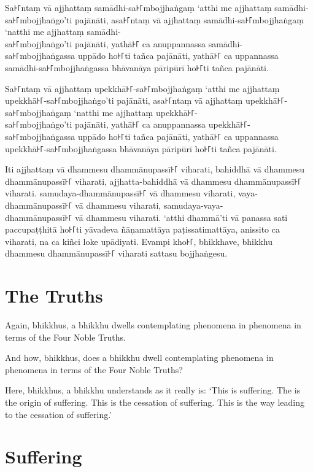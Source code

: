 Sa꜔꜒ntaṃ vā ajjhattaṃ samādhi-sa꜔꜒mbojjhaṅgaṃ ‘atthi me ajjhattaṃ samādhi-sa꜔꜒mbojjhaṅgo’ti pajānāti,
asa꜔꜒ntaṃ vā ajjhattaṃ samādhi-sa꜔꜒mbojjhaṅgaṃ ‘natthi me ajjhattaṃ samādhi-\\ sa꜔꜒mbojjhaṅgo’ti pajānāti,
yathā꜔꜒ ca anuppannassa samādhi-\\ sa꜔꜒mbojjhaṅgassa uppādo ho꜔꜒ti tañca pajānāti,
yathā꜔꜒ ca uppannassa samādhi-sa꜔꜒mbojjhaṅgassa bhāvanāya pāripūrī ho꜔꜒ti tañca pajānāti.

Sa꜔꜒ntaṃ vā ajjhattaṃ upekkhā꜔꜒-sa꜔꜒mbojjhaṅgaṃ ‘atthi me ajjhattaṃ upekkhā꜔꜒-sa꜔꜒mbojjhaṅgo’ti pajānāti,
asa꜔꜒ntaṃ vā ajjhattaṃ upekkhā꜔꜒-sa꜔꜒mbojjhaṅgaṃ ‘natthi me ajjhattaṃ upekkhā꜔꜒-\\ sa꜔꜒mbojjhaṅgo’ti pajānāti,
yathā꜔꜒ ca anuppannassa upekkhā꜔꜒-\\ sa꜔꜒mbojjhaṅgassa uppādo ho꜔꜒ti tañca pajānāti,
yathā꜔꜒ ca uppannassa upekkhā꜔꜒-sa꜔꜒mbojjhaṅgassa bhāvanāya pāripūrī ho꜔꜒ti tañca pajānāti.

Iti ajjhattaṃ vā dhammesu dhammānupassī꜔꜒ viharati,
bahiddhā vā dhammesu dhammānupassī꜔꜒ viharati,
ajjhatta-bahiddhā vā dhammesu dhammānupassī꜔꜒ viharati.
samudaya-dhammānupassī꜔꜒ vā dhammesu viharati,
vaya-dhammānupassī꜔꜒ vā dhammesu viharati,
samudaya-vaya-\\ dhammānupassī꜔꜒ vā dhammesu viharati.
‘atthi dhammā’ti vā panassa sati paccupaṭṭhitā ho꜔꜒ti
yāvadeva ñāṇamattāya paṭissatimattāya, anissito ca viharati,
na ca kiñci loke upādiyati. Evampi kho꜔꜒, bhikkhave, bhikkhu
dhammesu dhammānupassī꜔꜒ viharati sattasu bojjhaṅgesu.

\enlargethispage{\baselineskip}


\englishPage
\section*{The Truths}%

Again, bhikkhus, a bhikkhu dwells contemplating phenomena in phenomena in terms
of the Four Noble Truths.

And how, bhikkhus, does a bhikkhu dwell contemplating phenomena in phenomena in
terms of the Four Noble Truths?

Here, bhikkhus, a bhikkhu understands as it really is: `This is suffering. The
is the origin of suffering. This is the cessation of suffering. This is the way
leading to the cessation of suffering.'

\section{Suffering}

